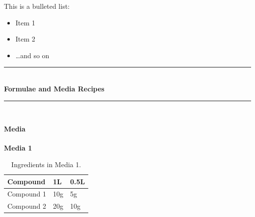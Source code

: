 \documentclass[idxtotoc,hyperref,openany]{labbook} %
\newcommand{\HRule}{\rule{\linewidth}{0.5mm}} %
\begin{document}
This is a bulleted list:

\begin{itemize}
\item Item 1
\item Item 2
\item \ldots and so on
\end{itemize}



\lipsum[6]



\lipsum[7]


\labday{} %

\begin{center}
\HRule \\[0.4cm]
{\huge \textbf{Formulae and Media Recipes}}\\[0.4cm] %
\HRule \\[1.5cm]
\end{center}


\newpage

\huge \textbf{Media} \\ \\

\normalsize \textbf{Media 1}\\
\begin{table}[H]
\begin{tabular}{l l l}
\toprule
\textbf{Compound} & \textbf{1L} & \textbf{0.5L}\\
\toprule
Compound 1 & 10g & 5g\\
Compound 2 & 20g & 10g\\
\bottomrule
\end{tabular}
\caption{Ingredients in Media 1.}
\label{tab:med1}
\end{table}

\end{document}
